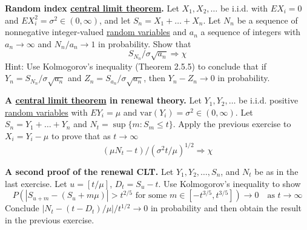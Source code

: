   \begin{exercise}[Durrett 3.4.6]
    \textbf{Random index \hyperref[thm:central-limit-theorem]{central limit theorem}.} Let $X_1, X_2, \dots$ be i.i.d. with $EX_i = 0$ and $EX_i^2 = \sigma^2 \in (0, \infty)$, and let $S_n = X_1 + \dots + X_n$. Let $N_n$ be a sequence of nonnegative integer-valued \hyperref[def:random-variable]{random variables} and $a_n$ a sequence of integers with $a_n \to \infty$ and $N_n/a_n \to 1$ in probability. Show that
    \begin{equation*}
      S_{N_n}/\sigma\sqrt{a_n} \Rightarrow \chi
    \end{equation*}
    Hint: Use Kolmogorov's inequality (Theorem 2.5.5) to conclude that if $Y_n = S_{N_n}/\sigma\sqrt{a_n}$ and $Z_n = S_{a_n}/\sigma\sqrt{a_n}$, then $Y_n - Z_n \to 0$ in probability.
  \end{exercise}
  \begin{solution}

  \end{solution}

  \begin{exercise}[Durrett 3.4.7]
    \textbf{A \hyperref[thm:central-limit-theorem]{central limit theorem} in renewal theory.} Let $Y_1, Y_2, \dots$ be i.i.d. positive \hyperref[def:random-variable]{random variables} with $EY_i = \mu$ and $\text{var}(Y_i) = \sigma^2 \in (0, \infty)$. Let $S_n = Y_1 + \dots + Y_n$ and $N_t = \sup\{m : S_m \leq t\}$. Apply the previous exercise to $X_i = Y_i - \mu$ to prove that as $t \to \infty$
    \begin{equation*}
      (\mu N_t - t)/(\sigma^2 t / \mu)^{1/2} \Rightarrow \chi
    \end{equation*}
  \end{exercise}
  \begin{solution}

  \end{solution}

  \begin{exercise}[Durrett 3.4.8]
    \textbf{A second proof of the renewal CLT.} Let $Y_1, Y_2, \dots, S_n$, and $N_t$ be as in the last exercise. Let $u = [t/\mu]$, $D_t = S_u - t$. Use Kolmogorov's inequality to show
    \begin{equation*}
      P(|S_{u+m} - (S_u + m\mu)| > t^{2/5} \text{ for some } m \in [-t^{3/5}, t^{3/5}]) \to 0 \quad \text{as } t \to \infty
    \end{equation*}
    Conclude $|N_t - (t - D_t)/\mu| / t^{1/2} \to 0$ in probability and then obtain the result in the previous exercise.
  \end{exercise}
  \begin{solution}

  \end{solution}

